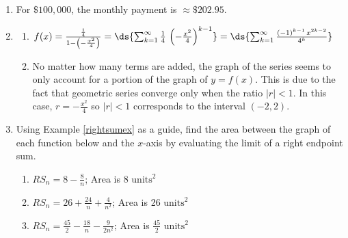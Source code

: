 \documentclass{ximera}
\begin{document}
\begin{enumerate}
\setcounter{enumi}{\value{HW}}

\item  For $\$100,\!000$, the monthly payment is $\approx \$202.95$.

\item  \begin{enumerate} \addtocounter{enumii}{1}  \item $f(x) = \frac{\frac{1}{4}}{1 - \left( -\frac{x^2}{4} \right)} = \ds{\sum_{k=1}^{\infty} \frac{1}{4} \,\left( -\frac{x^2}{4} \right)^{k-1}} = \ds{\sum_{k=1}^{\infty} \frac{(-1)^{k-1} \, x^{2k-2}}{4^{k}}} $
\item  No matter how many terms are added, the graph of the series seems to only account for a portion of the graph of $y = f(x)$.  This is due to the fact that geometric series converge only when the ratio $|r| < 1$.  In this case, $r =  -\frac{x^2}{4}$ so $|r| < 1$ corresponds to the interval $(-2,2)$.

\end{enumerate}

\item  Using Example \ref{rightsumex} as a guide, find the area between the graph of each function below and the $x$-axis by evaluating the limit of a right endpoint sum.



\begin{enumerate}

\item  $RS_{n} = 8 - \frac{8}{n}$;  Area is 8 $\text{units}^2$

\item    $RS_{n} = 26 + \frac{24}{n} + \frac{4}{n^2}$;  Area is 26 $\text{units}^2$

\item  $RS_{n} = \frac{45}{2}  - \frac{18}{n} - \frac{9}{2n^2}$;     Area is $\frac{45}{2}$  $\text{units}^2$


\end{enumerate}



\end{enumerate}
\end{document}
